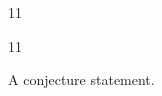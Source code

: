 \documentclass[paper=A4]{ropas-poster}
\begin{document}
\begin{postergrid}{1}{1}
\begin{posterblock}{1}{1}
\begin{conjecture}A conjecture statement.\end{conjecture}
\end{posterblock}
\end{postergrid}
\end{document}
